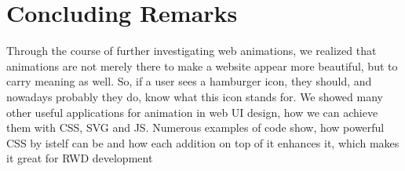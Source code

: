 %
%
% 
% 
% 


\chapter{Concluding Remarks}

\label{chap:Concl}

Through the course of further investigating web animations, we realized that animations are not merely there to make a website appear more beautiful, but to carry meaning as well. So, if a user sees a hamburger icon, they should, and nowadays probably they do, know what this icon stands for. We showed many other useful applications for animation in web UI design, how we can achieve them with CSS, SVG and JS. Numerous examples of code show, how powerful CSS by istelf can be and how each addition on top of it enhances it, which makes it great for RWD development 
